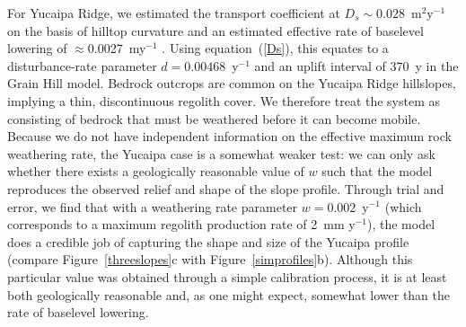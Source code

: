 \documentclass[esurf, manuscript]{copernicus}
\begin{document}
For Yucaipa Ridge, we estimated the transport coefficient at $D_s\sim0.028$~m$^2$y$^{-1}$ on the basis of hilltop curvature and an estimated effective rate of baselevel lowering of  $\approx$0.0027~my$^{-1}$ \citep{binnie2007tectonic}. Using equation~(\ref{Ds}), this equates to a disturbance-rate parameter $d=0.00468$~y$^{-1}$ and an uplift interval of 370~y in the Grain Hill model. Bedrock outcrops are common on the Yucaipa Ridge hillslopes, implying a thin, discontinuous regolith cover. We therefore treat the system as consisting of bedrock that must be weathered before it can become mobile. Because we do not have independent information on the effective maximum rock weathering rate, the Yucaipa case is a somewhat weaker test: we can only ask whether there exists a geologically reasonable value of $w$ such that the model reproduces the observed relief and shape of the slope profile. Through trial and error, we find that with a weathering rate parameter $w=0.002$~y$^{-1}$ (which corresponds to a maximum regolith production rate of 2~mm y$^{-1}$), the model does a credible job of capturing the shape and size of the Yucaipa profile (compare Figure~\ref{threeslopes}c with Figure~\ref{simprofiles}b). Although this particular value was obtained through a simple calibration process, it is at least both geologically reasonable and, as one might expect, somewhat lower than the rate of baselevel lowering.

% 
% 
% 
% 
% 
% 
\end{document}
